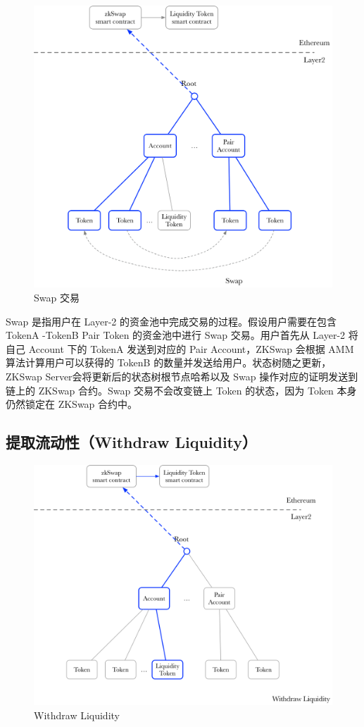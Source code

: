 \documentclass[]{template/llncs}
\begin{document}
\begin{figure}[htbp]
\centering
\includegraphics[width=0.9\columnwidth]{figure/swap}
\caption{Swap 交易}
\label{fig:swap}
\end{figure}

Swap 是指用户在 Layer-2 的资金池中完成交易的过程。假设用户需要在包含 TokenA -TokenB Pair Token 的资金池中进行 Swap 交易。用户首先从 Layer-2 将自己 Account 下的 TokenA 发送到对应的 Pair Account，ZKSwap 会根据 AMM 算法计算用户可以获得的 TokenB 的数量并发送给用户。状态树随之更新，ZKSwap Server会将更新后的状态树根节点哈希以及 Swap 操作对应的证明发送到链上的 ZKSwap 合约。Swap 交易不会改变链上 Token 的状态，因为 Token 本身仍然锁定在 ZKSwap 合约中。

\subsection{提取流动性（Withdraw Liquidity）}

\begin{figure}[htbp]
\centering
\includegraphics[width=0.9\columnwidth]{figure/withdraw_liquidity}
\caption{Withdraw Liquidity}
\label{fig:withdraw_liquidity}
\end{figure}
\end{document}
